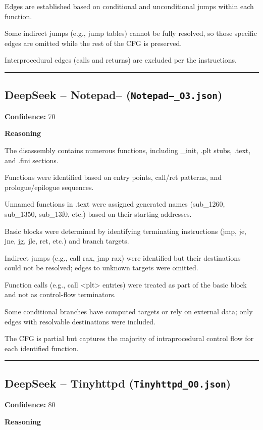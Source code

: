 Edges are established based on conditional and unconditional jumps within each function.

Some indirect jumps (e.g., jump tables) cannot be fully resolved, so those specific edges are omitted while the rest of the CFG is preserved.

Interprocedural edges (calls and returns) are excluded per the instructions.

\bigskip
\hrule
\bigskip

\subsection{DeepSeek -- Notepad-- (\texttt{Notepad--\_O3.json})}

\textbf{Confidence:} 70

\textbf{Reasoning}

The disassembly contains numerous functions, including \_init, .plt stubs, .text, and .fini sections.

Functions were identified based on entry points, call/ret patterns, and prologue/epilogue sequences.

Unnamed functions in .text were assigned generated names (sub\_1260, sub\_1350, sub\_13f0, etc.) based on their starting addresses.

Basic blocks were determined by identifying terminating instructions (jmp, je, jne, jg, jle, ret, etc.) and branch targets.

Indirect jumps (e.g., call rax, jmp rax) were identified but their destinations could not be resolved; edges to unknown targets were omitted.

Function calls (e.g., call <plt> entries) were treated as part of the basic block and not as control-flow terminators.

Some conditional branches have computed targets or rely on external data; only edges with resolvable destinations were included.

The CFG is partial but captures the majority of intraprocedural control flow for each identified function.

\bigskip
\hrule
\bigskip

\subsection{DeepSeek -- Tinyhttpd (\texttt{Tinyhttpd\_O0.json})}

\textbf{Confidence:} 80

\textbf{Reasoning}

